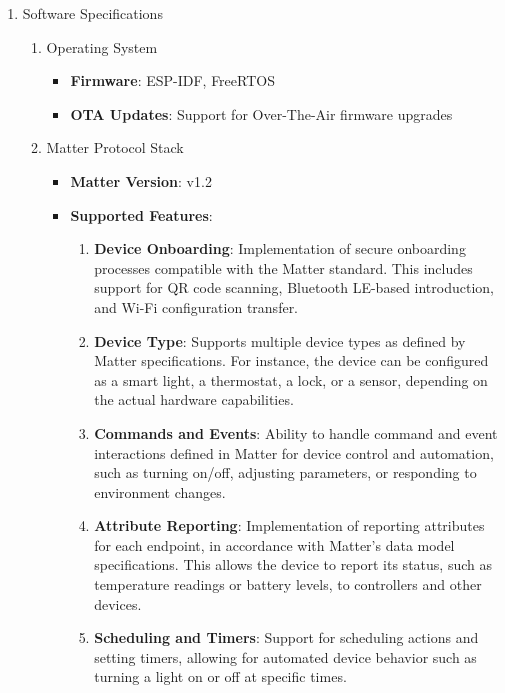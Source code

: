 \documentclass[conference]{IEEEtran}
\begin{document}
\begin{enumerate}[label=\arabic*.]
\item Software Specifications\\
\begin{enumerate}[label=\alph*.]
\item Operating System\\
\begin{itemize}
\item \textbf{Firmware}: ESP-IDF, FreeRTOS\\
\item \textbf{OTA Updates}: Support for Over-The-Air firmware upgrades\\
\end{itemize}

\item Matter Protocol Stack\\
\begin{itemize}
\item \textbf{Matter Version}: v1.2\\
\item \textbf{Supported Features}:\\
\begin{enumerate}[label=\roman*.]
\item \textbf{Device Onboarding}: Implementation of secure onboarding processes compatible with the Matter standard. This includes support for QR code scanning, Bluetooth LE-based introduction, and Wi-Fi configuration transfer.\\
\item \textbf{Device Type}: Supports multiple device types as defined by Matter specifications. For instance, the device can be configured as a smart light, a thermostat, a lock, or a sensor, depending on the actual hardware capabilities.\\
\item \textbf{Commands and Events}: Ability to handle command and event interactions defined in Matter for device control and automation, such as turning on/off, adjusting parameters, or responding to environment changes.\\
\item \textbf{Attribute Reporting}: Implementation of reporting attributes for each endpoint, in accordance with Matter's data model specifications. This allows the device to report its status, such as temperature readings or battery levels, to controllers and other devices.\\
\item \textbf{Scheduling and Timers}: Support for scheduling actions and setting timers, allowing for automated device behavior such as turning a light on or off at specific times.\\

\end{enumerate}
\end{itemize}
\end{enumerate}
\end{enumerate}
\end{document}

